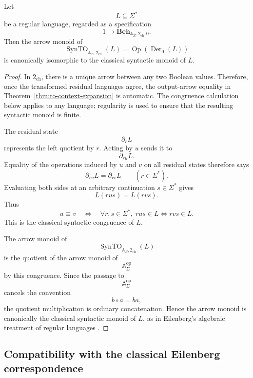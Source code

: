 \begin{proposition}
\label{prop:to-classical-syntactic-monoid-recovery}
    Let
    \[
        L\subseteq\Sigma^*
    \]
    be a regular language, regarded as a specification
    \[
        1\to
        \mathbf{Beh}_{\mathbb A_\Sigma,2_{\mathrm{ch}},0}.
    \]
    Then the arrow monoid of
    \[
        \operatorname{SynTO}_{\mathbb A_\Sigma,2_{\mathrm{ch}}}(L)
        =
        \operatorname{Op}(\operatorname{Der}_0(L))
    \]
    is canonically isomorphic to the classical syntactic monoid of \(L\).
\end{proposition}

\begin{proof}
    In \(2_{\mathrm{ch}}\), there is a unique arrow between any two Boolean
    values. Therefore, once the transformed residual languages agree, the
    output-arrow equality in Theorem~\ref{thm:to-context-expansion} is
    automatic. The congruence calculation below applies to any language;
    regularity is used to ensure that the resulting syntactic monoid is finite.

    The residual state
    \[
        \partial_rL
    \]
    represents the left quotient by \(r\). Acting by \(u\) sends it to
    \[
        \partial_{ru}L.
    \]
    Equality of the operations induced by \(u\) and \(v\) on all residual
    states therefore says
    \[
        \partial_{ru}L=\partial_{rv}L
        \qquad(r\in\Sigma^*).
    \]
    Evaluating both sides at an arbitrary continuation \(s\in\Sigma^*\) gives
    \[
        L(rus)=L(rvs).
    \]
    Thus
    \[
        u\equiv v
        \quad\Longleftrightarrow\quad
        \forall r,s\in\Sigma^*,\;
        rus\in L\Longleftrightarrow rvs\in L.
    \]
    This is the classical syntactic congruence of \(L\).

    The arrow monoid of
    \[
        \operatorname{SynTO}_{\mathbb A_\Sigma,2_{\mathrm{ch}}}(L)
    \]
    is the quotient of the arrow monoid of
    \[
        \mathbb A_\Sigma^{\mathrm{op}}
    \]
    by this congruence. Since the passage to
    \[
        \mathbb A_\Sigma^{\mathrm{op}}
    \]
    cancels the convention
    \[
        b\circ a=ba,
    \]
    the quotient multiplication is ordinary concatenation. Hence the arrow
    monoid is canonically the classical syntactic monoid of \(L\), as in
    Eilenberg's algebraic treatment of regular languages
    \cite{Eilenberg1974}.
\end{proof}

\subsection{Compatibility with the classical Eilenberg correspondence}
\label{subsec:to-classical-eilenberg-compatibility}

